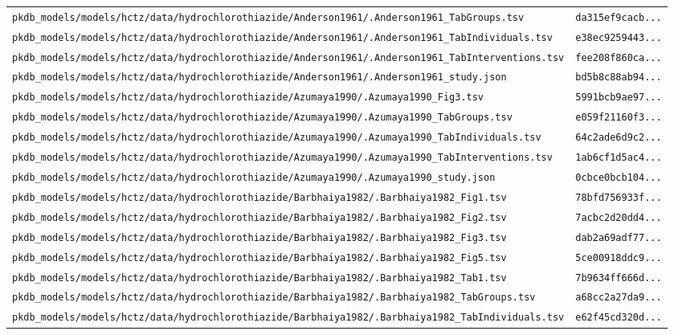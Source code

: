 \documentclass{article}
\begin{document}
\begin{longtable}{ll}
\texttt{pkdb\_models/models/hctz/data/hydrochlorothiazide/Anderson1961/.Anderson1961\_TabGroups.tsv} & \texttt{da315ef9cacb...} \\
\texttt{pkdb\_models/models/hctz/data/hydrochlorothiazide/Anderson1961/.Anderson1961\_TabIndividuals.tsv} & \texttt{e38ec9259443...} \\
\texttt{pkdb\_models/models/hctz/data/hydrochlorothiazide/Anderson1961/.Anderson1961\_TabInterventions.tsv} & \texttt{fee208f860ca...} \\
\texttt{pkdb\_models/models/hctz/data/hydrochlorothiazide/Anderson1961/.Anderson1961\_study.json} & \texttt{bd5b8c88ab94...} \\
\texttt{pkdb\_models/models/hctz/data/hydrochlorothiazide/Azumaya1990/.Azumaya1990\_Fig3.tsv} & \texttt{5991bcb9ae97...} \\
\texttt{pkdb\_models/models/hctz/data/hydrochlorothiazide/Azumaya1990/.Azumaya1990\_TabGroups.tsv} & \texttt{e059f21160f3...} \\
\texttt{pkdb\_models/models/hctz/data/hydrochlorothiazide/Azumaya1990/.Azumaya1990\_TabIndividuals.tsv} & \texttt{64c2ade6d9c2...} \\
\texttt{pkdb\_models/models/hctz/data/hydrochlorothiazide/Azumaya1990/.Azumaya1990\_TabInterventions.tsv} & \texttt{1ab6cf1d5ac4...} \\
\texttt{pkdb\_models/models/hctz/data/hydrochlorothiazide/Azumaya1990/.Azumaya1990\_study.json} & \texttt{0cbce0bcb104...} \\
\texttt{pkdb\_models/models/hctz/data/hydrochlorothiazide/Barbhaiya1982/.Barbhaiya1982\_Fig1.tsv} & \texttt{78bfd756933f...} \\
\texttt{pkdb\_models/models/hctz/data/hydrochlorothiazide/Barbhaiya1982/.Barbhaiya1982\_Fig2.tsv} & \texttt{7acbc2d20dd4...} \\
\texttt{pkdb\_models/models/hctz/data/hydrochlorothiazide/Barbhaiya1982/.Barbhaiya1982\_Fig3.tsv} & \texttt{dab2a69adf77...} \\
\texttt{pkdb\_models/models/hctz/data/hydrochlorothiazide/Barbhaiya1982/.Barbhaiya1982\_Fig5.tsv} & \texttt{5ce00918ddc9...} \\
\texttt{pkdb\_models/models/hctz/data/hydrochlorothiazide/Barbhaiya1982/.Barbhaiya1982\_Tab1.tsv} & \texttt{7b9634ff666d...} \\
\texttt{pkdb\_models/models/hctz/data/hydrochlorothiazide/Barbhaiya1982/.Barbhaiya1982\_TabGroups.tsv} & \texttt{a68cc2a27da9...} \\
\texttt{pkdb\_models/models/hctz/data/hydrochlorothiazide/Barbhaiya1982/.Barbhaiya1982\_TabIndividuals.tsv} & \texttt{e62f45cd320d...} \\

\end{longtable}
\end{document}
